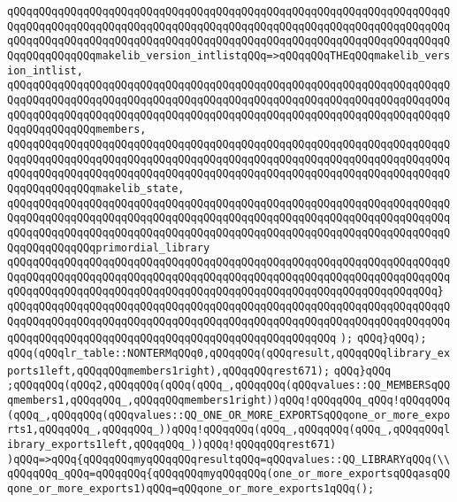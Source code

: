 \verb|qQQqqQQqqQQqqQQqqQQqqQQqqQQqqQQqqQQqqQQqqQQqqQQqqQQqqQQqqQQqqQQqqQQqqQQqqQQqqQQqqQQqqQQqqQQqqQQqqQQqqQQqqQQqqQQqqQQqqQQqqQQqqQQqqQQqqQQqqQQqqQQqqQQqqQQqqQQqqQQqqQQqqQQqqQQqqQQqqQQqqQQqqQQqqQQqqQQqqQQqqQQqqQQqqQQqqQQqqQQqqQQqmakelib_version_intlistqQQq=>qQQqqQQqTHEqQQqmakelib_version_intlist,|\newline
\verb|qQQqqQQqqQQqqQQqqQQqqQQqqQQqqQQqqQQqqQQqqQQqqQQqqQQqqQQqqQQqqQQqqQQqqQQqqQQqqQQqqQQqqQQqqQQqqQQqqQQqqQQqqQQqqQQqqQQqqQQqqQQqqQQqqQQqqQQqqQQqqQQqqQQqqQQqqQQqqQQqqQQqqQQqqQQqqQQqqQQqqQQqqQQqqQQqqQQqqQQqqQQqqQQqqQQqqQQqqQQqqQQqmembers,|\newline
\verb|qQQqqQQqqQQqqQQqqQQqqQQqqQQqqQQqqQQqqQQqqQQqqQQqqQQqqQQqqQQqqQQqqQQqqQQqqQQqqQQqqQQqqQQqqQQqqQQqqQQqqQQqqQQqqQQqqQQqqQQqqQQqqQQqqQQqqQQqqQQqqQQqqQQqqQQqqQQqqQQqqQQqqQQqqQQqqQQqqQQqqQQqqQQqqQQqqQQqqQQqqQQqqQQqqQQqqQQqqQQqqQQqmakelib_state,|\newline
\verb|qQQqqQQqqQQqqQQqqQQqqQQqqQQqqQQqqQQqqQQqqQQqqQQqqQQqqQQqqQQqqQQqqQQqqQQqqQQqqQQqqQQqqQQqqQQqqQQqqQQqqQQqqQQqqQQqqQQqqQQqqQQqqQQqqQQqqQQqqQQqqQQqqQQqqQQqqQQqqQQqqQQqqQQqqQQqqQQqqQQqqQQqqQQqqQQqqQQqqQQqqQQqqQQqqQQqqQQqqQQqqQQqprimordial_library|\newline
\verb|qQQqqQQqqQQqqQQqqQQqqQQqqQQqqQQqqQQqqQQqqQQqqQQqqQQqqQQqqQQqqQQqqQQqqQQqqQQqqQQqqQQqqQQqqQQqqQQqqQQqqQQqqQQqqQQqqQQqqQQqqQQqqQQqqQQqqQQqqQQqqQQqqQQqqQQqqQQqqQQqqQQqqQQqqQQqqQQqqQQqqQQqqQQqqQQqqQQqqQQqqQQqqQQq}|\newline
\verb|qQQqqQQqqQQqqQQqqQQqqQQqqQQqqQQqqQQqqQQqqQQqqQQqqQQqqQQqqQQqqQQqqQQqqQQqqQQqqQQqqQQqqQQqqQQqqQQqqQQqqQQqqQQqqQQqqQQqqQQqqQQqqQQqqQQqqQQqqQQqqQQqqQQqqQQqqQQqqQQqqQQqqQQqqQQqqQQqqQQqqQQqqQQqqQQq|\newline
\verb|);|\newline
\verb|qQQq}qQQq);|\newline
\verb|qQQq(qQQqlr_table::NONTERMqQQq0,qQQqqQQq(qQQqresult,qQQqqQQqlibrary_exports1left,qQQqqQQqmembers1right),qQQqqQQqrest671);|\newline
\verb|qQQq}qQQq|\newline
\verb|;qQQqqQQq(qQQq2,qQQqqQQq(qQQq(qQQq_,qQQqqQQq(qQQqvalues::QQ_MEMBERSqQQqmembers1,qQQqqQQq_,qQQqqQQqmembers1right))qQQq!qQQqqQQq_qQQq!qQQqqQQq(qQQq_,qQQqqQQq(qQQqvalues::QQ_ONE_OR_MORE_EXPORTSqQQqone_or_more_exports1,qQQqqQQq_,qQQqqQQq_))qQQq!qQQqqQQq(qQQq_,qQQqqQQq(qQQq_,qQQqqQQqlibrary_exports1left,qQQqqQQq_))qQQq!qQQqqQQqrest671)|\newline
\verb|)qQQq=>qQQq{qQQqqQQqmyqQQqqQQqresultqQQq=qQQqvalues::QQ_LIBRARYqQQq(\\qQQqqQQq_qQQq=qQQqqQQq{qQQqqQQqmyqQQqqQQq(one_or_more_exportsqQQqasqQQqone_or_more_exports1)qQQq=qQQqone_or_more_exports1qQQq();|\newline
